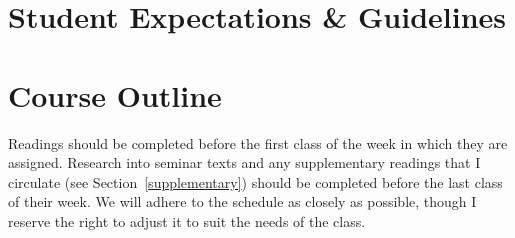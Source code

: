 \documentclass[titlepage]{article}
\newcommand\policy{../policy}
\begin{document}
\section{Student Expectations \& Guidelines}
\label{expectations}







\section{Course Outline}
\label{outline}

Readings should be completed before the first class of the week in which
they are assigned. Research into seminar texts and any supplementary
readings that I circulate (see Section~\ref{supplementary}) should be
completed before the last class of their week. We will adhere to the
schedule as closely as possible, though I reserve the right to adjust it
to suit the needs of the class.
\end{document}
